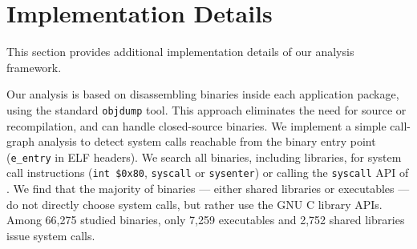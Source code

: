 \section{Implementation Details}
\label{sec:framework}

This section provides additional implementation details of our analysis framework. %


Our analysis is based on disassembling binaries inside each application package, using the standard {\tt objdump} tool.
This approach eliminates the need for source or recompilation, and can handle closed-source binaries.
We implement a simple call-graph analysis to detect system calls reachable from the binary entry point ({\tt e\_entry} in ELF headers). 
We search all binaries, including libraries, for system call instructions ({\tt int \$0x80}, {\tt syscall} or {\tt sysenter}) or calling the {\tt syscall} API of \libc{}.
We find that the majority of binaries --- either shared libraries or executables --- do not directly choose system calls, but 
rather use the GNU C library APIs.
Among 66,275 studied binaries, only 7,259 executables and 2,752 shared libraries issue system calls.





